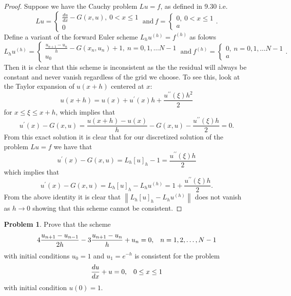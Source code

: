 \documentclass[12pt]{article}
\theoremstyle{definition}
\newtheorem{problem}{Problem}
\newcommand\norm[1]{\left\lVert#1\right\rVert}
\begin{document}
\begin{proof}
  Suppose we have the Cauchy problem $Lu = f$, as defined in 9.30 i.e.
  \[
      Lu =
      \begin{cases}
        \frac{du}{dx} - G(x, u),\ 0 < x \leq 1 \\
        0
      \end{cases}
      \ \text{and} \
      f =
      \begin{cases}
        0,\ 0 < x \leq 1 \\
        a
      \end{cases}.
  \]
  Define a variant of the forward Euler scheme $L_hu^{(h)} = f^{(h)}$ as folows
  \[
      L_hu^{(h)} =
      \begin{cases}
        \frac{u_{n+1} - u_{n}}{h} - G(x_n, u_n) + 1,\  n = 0, 1, \dots N-1 \\
        u_0
      \end{cases}
      \ \text{and} \
      f^{(h)} =
      \begin{cases}
        0,\  n = 0, 1, \dots N-1 \\
        a
      \end{cases}.
  \]
  Then it is clear that this scheme is inconsistent as the the residual will always
  be constant and never vanish regardless of the grid we choose. To see this, look at the
  Taylor expansion of $u(x + h)$ centered at $x$:
  \[
    u(x + h) = u(x) + u^{\prime}(x) h + \frac{u^{\prime \prime}(\xi) h^2}{2}
  \]
  for $x \leq \xi \leq x+h$, which implies that
  \[
    u^{\prime}(x) - G(x, u) = \frac{u(x+h) - u(x)}{h} - G(x, u) - \frac{u^{\prime \prime}(\xi) h}{2} = 0.
  \]
  From this exact solution it is clear that for our discretized solution of the problem $Lu =f$ we have that
  \[
    u^{\prime}(x) - G(x, u) = L_h[u]_h - 1 = \frac{u^{\prime \prime}(\xi) h}{2}
  \]
  which implies that
  \[
    u^{\prime}(x) - G(x, u) = L_h[u]_h - L_h u^{(h)} = 1 + \frac{u^{\prime \prime}(\xi) h}{2}.
  \]
  From the above identity it is clear that $\norm{L_h[u]_h - L_h u^{(h)}}$ does
  not vanish as $h\to 0$ showing that this scheme cannot be consistent.
\end{proof}


\begin{problem}
  Prove that the scheme
  \[
    4 \frac{u_{n+1} - u_{n-1}}{2h} - 3 \frac{u_{n+1} - u_n}{h} + u_n = 0\text{,\quad $n = 1, 2, \dots, N-1$}
  \]
  with initial conditions $u_0 = 1$ and $u_1 = e^{-h}$ is consistent for the problem
  \[
    \frac{du}{dx} + u = 0\text{,\quad $0 \leq x \leq 1$}
  \]
  with initial condition $u(0) = 1$.
\end{problem}
\end{document}
